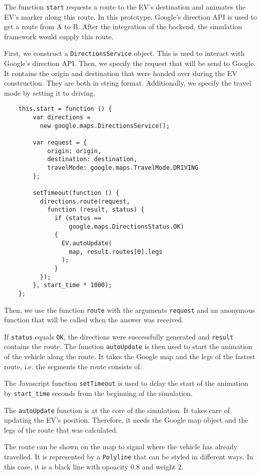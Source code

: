 The function \texttt{start} requests a route to the EV's destination and animates the EV's marker along this route. In this prototype, Google's direction API is used to get a route from A to B. After the integration of the backend, the simulation framework would supply this route.

First, we construct a \texttt{DirectionsService} object. This is used to interact with Google's direction API. Then, we specify the request that will be send to Google. It contains the origin and destination that were handed over during the EV construction. They are both in string format. Additionally, we specify the travel mode by setting it to driving.

\begin{verbatim}
    this.start = function () {
        var directions =
          new google.maps.DirectionsService();

        var request = {
            origin: origin,
            destination: destination,
            travelMode: google.maps.TravelMode.DRIVING
        };

        setTimeout(function () {
          directions.route(request,
            function (result, status) {
              if (status ==
                  google.maps.DirectionsStatus.OK)
              {
                EV.autoUpdate(
                  map, result.routes[0].legs
                );
              }
          });
        }, start_time * 1000);
    };
\end{verbatim}

Then, we use the function \texttt{route} with the arguments \texttt{request} and an anonymous function that will be called when the answer was received.

If \texttt{status} equals \texttt{OK}, the directions were successfully generated and \texttt{result} contains the route. The function \texttt{autoUpdate} is then used to start the animation of the vehicle along the route. It takes the Google map and the legs of the fastest route, i.e. the segments the route consists of.

The Javascript function \texttt{setTimeout} is used to delay the start of the animation by \texttt{start\_time} seconds from the beginning of the simulation.

The \texttt{autoUpdate} function is at the core of the simulation. It takes care of updating the EV's position. Therefore, it needs the Google map object and the legs of the route that was calculated.

The route can be shown on the map to signal where the vehicle has already travelled. It is represented by a \texttt{Polyline} that can be styled in different ways. In this case, it is a black line with opoacity $0.8$ and weight $2$.

